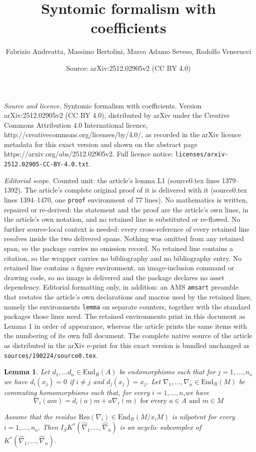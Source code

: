 \documentclass[10pt,a4paper]{amsart}
\title{Syntomic formalism with coefficients}
\author{Fabrizio Andreatta, Massimo Bertolini, Marco Adamo Seveso, Rodolfo Venerucci}
\date{Source: arXiv:2512.02905v2 (CC BY 4.0)}
\newtheorem{lemma}{Lemma}
\begin{document}
\maketitle

\noindent\emph{Source and licence.} Syntomic formalism with coefficients. Version arXiv:2512.02905v2 (CC BY 4.0), distributed by arXiv under the Creative Commons Attribution 4.0 International licence, http://creativecommons.org/licenses/by/4.0/, as recorded in the arXiv licence metadata for this exact version and shown on the abstract page https://arxiv.org/abs/2512.02905v2. Full licence notice: \texttt{licenses/arxiv-2512.02905-CC-BY-4.0.txt}.\par\smallskip

\noindent\textit{Editorial scope.} Counted unit: the article's lemma L1 (source0.tex lines 1379--1392). The article's complete original proof of it is delivered with it (source0.tex lines 1394--1470, one \texttt{proof} environment of 77 lines). No mathematics is written, repaired or re-derived: the statement and the proof are the article's own lines, in the article's own notation, and no retained line is substituted or re-flowed.  No further source-local context is needed: every cross-reference of every retained line resolves inside the two delivered spans.  Nothing was omitted from any retained span, so the package carries no omission record.  No retained line contains a citation, so the wrapper carries no bibliography and no bibliography entry.  No retained line contains a figure environment, an image-inclusion command or drawing code, so no image is delivered and the package declares no asset dependency.  Editorial formatting only, in addition: an AMS \texttt{amsart} preamble that restates the article's own declarations and macros used by the retained lines, namely the environments \texttt{lemma} on separate counters, together with the standard packages those lines need.  The retained environments print in this document as Lemma 1 in order of appearance, whereas the article prints the same items with the numbering of its own full document.  The complete native source of the article as distributed in the arXiv e-print for this exact version is bundled unchanged as \texttt{sources/190224/source0.tex}.
\begin{lemma}\label{lemma:Kos L1} 
Let $d_{1},\ldots d_{n}\in \mathrm{End}_{R}(
A) $  be endomorphisms such that for $j=1,\ldots,n_{o}$ we have  $d_{i}\left( x_{j}\right) =0$ if $i\neq j$ and $d_{j}\left( x_{j}\right) =x_{j}$. Let $ \nabla _{1},\ldots,\nabla _{n}\in \mathrm{End}_{R}(M) $ be commuting homomorphisms such that, for every $i=1,\ldots,n$,we have
\begin{equation}
\nabla _{i}\left( am\right) =d_{i}\left( a\right) m+a\nabla _{i}\left(
m\right) \text{ for every }a\in A\text{ and }m\in M  \label{Kos L1 F1 Clm}
\end{equation}

Assume that the residue $\mathrm{Res}(\nabla _{i})\in \mathrm{End}_R(M/x_i M)$ is
nilpotent for every $i=1,\ldots,n_{o}$.  Then  $I_{S}K^\ast\left( 
\widehat{\nabla }_{1},\ldots,\widehat{\nabla }_{n}\right) $ is an acyclic
subcomplex of $K^\ast\left( \widehat{\nabla }_{1},\ldots,\widehat{
\nabla }_{n}\right) $.  
\end{lemma}
\end{document}
